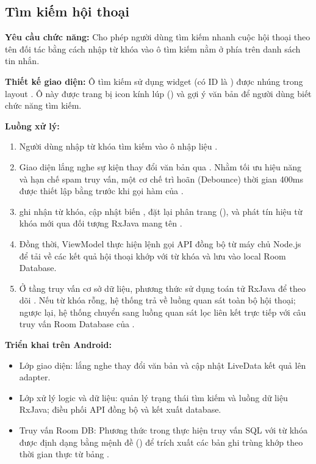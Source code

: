 \subsection{Tìm kiếm hội thoại}
\textbf{Yêu cầu chức năng:} Cho phép người dùng tìm kiếm nhanh cuộc hội thoại theo tên đối tác bằng cách nhập từ khóa vào ô tìm kiếm nằm ở phía trên danh sách tin nhắn.

\textbf{Thiết kế giao diện:} Ô tìm kiếm sử dụng widget  (có ID là ) được nhúng trong layout . Ô này được trang bị icon kính lúp () và gợi ý văn bản để người dùng biết chức năng tìm kiếm.

\textbf{Luồng xử lý:} 
\begin{enumerate}
    \item Người dùng nhập từ khóa tìm kiếm vào ô nhập liệu .
    \item Giao diện lắng nghe sự kiện thay đổi văn bản qua . Nhằm tối ưu hiệu năng và hạn chế spam truy vấn, một cơ chế trì hoãn (Debounce) thời gian 400ms được thiết lập bằng  trước khi gọi hàm  của .
    \item {} ghi nhận từ khóa, cập nhật biến , đặt lại phân trang (), và phát tín hiệu từ khóa mới qua đối tượng RxJava  mang tên .
    \item Đồng thời, ViewModel thực hiện lệnh gọi API đồng bộ  từ máy chủ Node.js để tải về các kết quả hội thoại khớp với từ khóa và lưu vào local Room Database.
    \item Ở tầng truy vấn cơ sở dữ liệu, phương thức  sử dụng toán tử RxJava  để theo dõi . Nếu từ khóa rỗng, hệ thống trả về luồng quan sát toàn bộ hội thoại; ngược lại, hệ thống chuyển sang luồng quan sát lọc  liên kết trực tiếp với câu truy vấn Room Database của .
\end{enumerate}

\textbf{Triển khai trên Android:} 
\begin{itemize}
    \item Lớp giao diện:  lắng nghe thay đổi văn bản và cập nhật LiveData kết quả lên adapter.
    \item Lớp xử lý logic và dữ liệu:  quản lý trạng thái tìm kiếm và luồng dữ liệu RxJava;  điều phối API đồng bộ và kết xuất database.
    \item Truy vấn Room DB: Phương thức  trong  thực hiện truy vấn SQL với từ khóa được định dạng bằng mệnh đề  () để trích xuất các bản ghi trùng khớp theo thời gian thực từ bảng .
\end{itemize}

